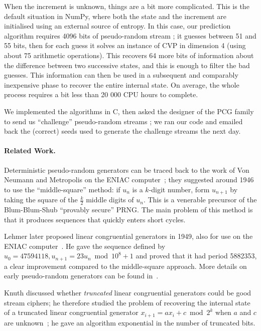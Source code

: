 \documentclass[submission,svgnames,journal=tosc]{iacrtrans}
\begin{document}
When the increment is unknown, things are a bit more complicated. This is the
default situation in \textsf{NumPy}, where both the state and the increment are
initialised using an external source of entropy. In this case, our prediction
algorithm requires 4096 bits of pseudo-random stream ; it guesses between 51 and
55 bits, then for each guess it solves an instance of CVP in dimension 4 (using
about 75 arithmetic operations). This recovers 64 more bits of information about
the difference between two successive states, and this is enough to filter the
bad guesses. This information can then be used in a subsequent and comparably
inexpensive phase to recover the entire internal state. On average, the whole
process requires a bit less than 20 000 CPU hours to complete.

We implemented the algorithms in \textsf{C}, then asked the designer of the
\textsf{PCG} family to send us ``challenge'' pseudo-random streams ; we ran our
code and emailed back the (correct) seeds used to generate the challenge streams the next
day.

\paragraph{Related Work.} Deterministic pseudo-random generators can be traced
back to the work of Von Neumann and Metropolis on the ENIAC
computer~\cite{vonNeumann1951}; they suggested around 1946 to use the
``middle-square'' method: if $u_n$ is a $k$-digit number, form $u_{n+1}$ by
taking the square of the $\frac{k}{2}$ middle digits of $u_n$. This is a
venerable precursor of the Blum-Blum-Shub ``provably secure'' PRNG. The main
problem of this method is that it produces sequences that quickly enters short
cycles.

Lehmer later proposed linear congruential generators in 1949, also for use on
the ENIAC computer~\cite{Lehmer}. He gave the sequence defined by
$u_0 = 47594118, u_{n+1} = 23 u_n \bmod 10^8 + 1$ and proved that it had period
5882353, a clear improvement compared to the middle-square approach. More
details on early pseudo-random generators can be found in~\cite{Knuth}.

Knuth discussed whether \emph{truncated} linear congruential generators could be
good stream ciphers; he therefore studied the problem of recovering the internal
state of a truncated linear congruential generator
$x_{i+1} = ax_i + c \bmod 2^k$ when $a$ and $c$ are unknown~\cite{Knuth85}; he
gave an algorithm exponential in the number of truncated bits.
\end{document}
